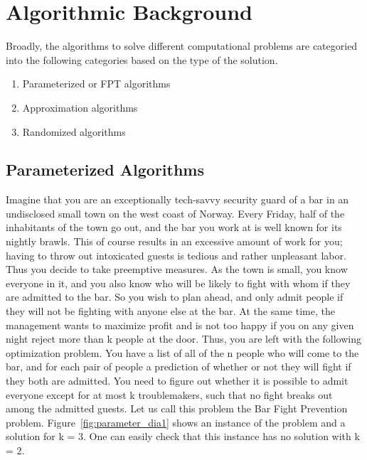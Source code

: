 \section{Algorithmic Background}
Broadly, the algorithms to solve different computational problems are categoried into the following categories based on the type of the solution.
\begin{enumerate}
 \item Parameterized or FPT algorithms
 \item Approximation algorithms 
 \item Randomized algorithms
\end{enumerate}

\subsection{Parameterized Algorithms}
Imagine that you are an exceptionally tech-savvy security guard of a bar
in an undisclosed small town on the west coast of Norway. Every Friday,
half of the inhabitants of the town go out, and the bar you work at is well
known for its nightly brawls. This of course results in an excessive amount
of work for you; having to throw out intoxicated guests is tedious and rather
unpleasant labor. Thus you decide to take preemptive measures. As the town
is small, you know everyone in it, and you also know who will be likely to
fight with whom if they are admitted to the bar. So you wish to plan ahead,
and only admit people if they will not be fighting with anyone else at the
bar. At the same time, the management wants to maximize profit and is not
too happy if you on any given night reject more than  k  people at the door.
Thus, you are left with the following optimization problem. You have a list
of all of the  n  people who will come to the bar, and for each pair of people
a prediction of whether or not they will fight if they both are admitted. You
need to figure out whether it is possible to admit everyone except for at most
k troublemakers, such that no fight breaks out among the admitted guests.
Let us call this problem the Bar Fight Prevention problem. Figure~\ref{fig:parameter_dia1} shows an instance of the problem and a solution for
 k = 3.  One can easily check that this instance has no solution with k = 2.
 
